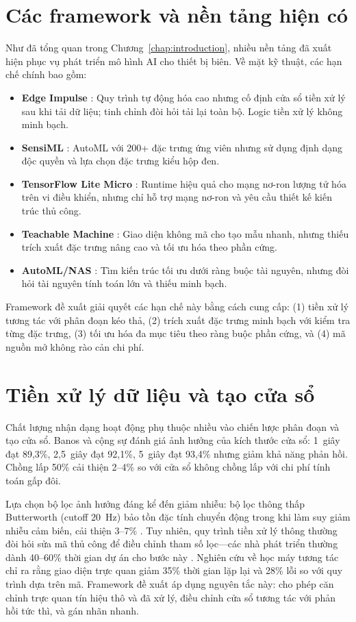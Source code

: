 \section{Các framework và nền tảng hiện có}
Như đã tổng quan trong Chương~\ref{chap:introduction}, nhiều nền tảng đã xuất hiện phục vụ phát triển mô hình AI cho thiết bị biên. Về mặt kỹ thuật, các hạn chế chính bao gồm:
\begin{itemize}
    \item \textbf{Edge Impulse} \cite{web:Edge_Impulse}: Quy trình tự động hóa cao nhưng cố định cửa sổ tiền xử lý sau khi tải dữ liệu; tinh chỉnh đòi hỏi tải lại toàn bộ. Logic tiền xử lý không minh bạch.
    \item \textbf{SensiML} \cite{web:SensiML}: AutoML với 200+ đặc trưng ứng viên nhưng sử dụng định dạng độc quyền và lựa chọn đặc trưng kiểu hộp đen.
    \item \textbf{TensorFlow Lite Micro} \cite{david2020tensorflow}: Runtime hiệu quả cho mạng nơ-ron lượng tử hóa trên vi điều khiển, nhưng chỉ hỗ trợ mạng nơ-ron và yêu cầu thiết kế kiến trúc thủ công.
    \item \textbf{Teachable Machine} \cite{web:Google_TeachableMachine}: Giao diện không mã cho tạo mẫu nhanh, nhưng thiếu trích xuất đặc trưng nâng cao và tối ưu hóa theo phần cứng.
    \item \textbf{AutoML/NAS} \cite{cai2018proxylessnas}: Tìm kiến trúc tối ưu dưới ràng buộc tài nguyên, nhưng đòi hỏi tài nguyên tính toán lớn và thiếu minh bạch.
\end{itemize}
Framework đề xuất giải quyết các hạn chế này bằng cách cung cấp: (1) tiền xử lý tương tác với phân đoạn kéo thả, (2) trích xuất đặc trưng minh bạch với kiểm tra từng đặc trưng, (3) tối ưu hóa đa mục tiêu theo ràng buộc phần cứng, và (4) mã nguồn mở không rào cản chi phí.

\section{Tiền xử lý dữ liệu và tạo cửa sổ}
Chất lượng nhận dạng hoạt động phụ thuộc nhiều vào chiến lược phân đoạn và tạo cửa sổ. Banos và cộng sự \cite{banos2014wisdm} đánh giá ảnh hưởng của kích thước cửa sổ: 1~giây đạt 89,3\%, 2,5~giây đạt 92,1\%, 5~giây đạt 93,4\% nhưng giảm khả năng phản hồi. Chồng lấp 50\% cải thiện 2--4\% so với cửa sổ không chồng lấp \cite{wan2021deep_har_review} với chi phí tính toán gấp đôi.

Lựa chọn bộ lọc ảnh hưởng đáng kể đến giảm nhiễu: bộ lọc thông thấp Butterworth (cutoff 20~Hz) bảo tồn đặc tính chuyển động trong khi làm suy giảm nhiễu cảm biến, cải thiện 3--7\% \cite{filippeschi2017survey_imu}. Tuy nhiên, quy trình tiền xử lý thông thường đòi hỏi sửa mã thủ công để điều chỉnh tham số lọc---các nhà phát triển thường dành 40--60\% thời gian dự án cho bước này \cite{merenda2020edge}. Nghiên cứu về học máy tương tác \cite{amershi2014power} chỉ ra rằng giao diện trực quan giảm 35\% thời gian lặp lại và 28\% lỗi so với quy trình dựa trên mã. Framework đề xuất áp dụng nguyên tắc này: cho phép căn chỉnh trực quan tín hiệu thô và đã xử lý, điều chỉnh cửa sổ tương tác với phản hồi tức thì, và gán nhãn nhanh.

